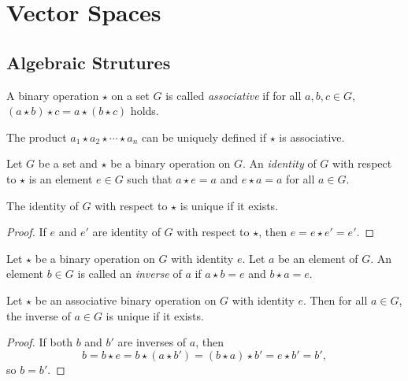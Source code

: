 \chapter{Vector Spaces}
\section{Algebraic Strutures}
\begin{definition}
  A binary operation $\star$ on a set $G$ is called \emph{associative} if
  for all $a, b, c \in G$, $(a \star b) \star c = a \star (b \star c)$ holds.
\end{definition}

\begin{remark}
  The product $a_1 \star a_2 \star \cdots \star a_n$ can be uniquely defined
  if $\star$ is associative.
\end{remark}

\begin{definition}
  Let $G$ be a set and $\star$ be a binary operation on $G$. An
  \emph{identity} of $G$ with respect to $\star$ is an element $e \in G$ such
  that $a \star e = a$ and $e \star a = a$ for all $a \in G$.
\end{definition}

\begin{observation}
  The identity of $G$ with respect to $\star$ is unique if it exists.
\end{observation}
\begin{proof}
  If $e$ and $e'$ are identity of $G$ with respect to $\star$, then
  $e = e \star e' = e'$.
\end{proof}

\begin{definition}
  Let $\star$ be a binary operation on $G$ with identity $e$. Let $a$ be an
  element of $G$. An element $b \in G$ is called an \emph{inverse} of $a$ if
  $a \star b = e$ and $b \star a = e$.
\end{definition}

\begin{observation}
  Let $\star$ be an associative binary operation on $G$ with identity $e$.
  Then for all $a \in G$, the inverse of $a \in G$ is unique if it exists.
\end{observation}
\begin{proof}
  If both $b$ and $b'$ are inverses of $a$, then
  $$
  b = b \star e = b \star (a \star b') = (b \star a) \star b'
    = e \star b' = b',
  $$
  so $b = b'$.
\end{proof}

